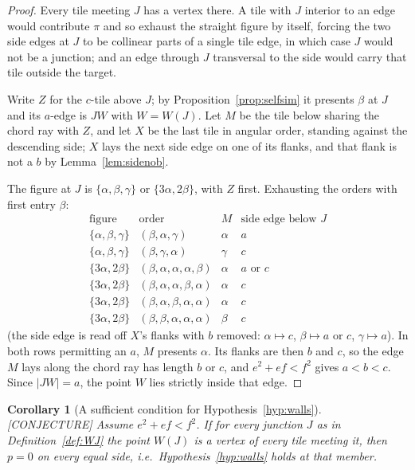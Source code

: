 \documentclass[11pt,reqno]{amsart}
\theoremstyle{plain}
\newtheorem{corollary}[theorem]{Corollary}
\theoremstyle{definition}
\newcommand{\lab}[1]{\hfill\textnormal{\footnotesize\textsc{[#1]}}}
\begin{document}
\begin{proof}
Every tile meeting $J$ has a vertex there. A tile with $J$ interior to an edge would contribute $\pi$
and so exhaust the straight figure by itself, forcing the two side edges at $J$ to be collinear parts of
a single tile edge, in which case $J$ would not be a junction; and an edge through $J$ transversal to the
side would carry that tile outside the target.

Write $Z$ for the $c$-tile above $J$; by Proposition~\ref{prop:selfsim} it presents $\beta$ at $J$ and
its $a$-edge is $JW$ with $W=W(J)$. Let $M$ be the tile below sharing the chord ray with $Z$, and let
$X$ be the last tile in angular order, standing against the descending side; $X$ lays the next side
edge on one of its flanks, and that flank is not a $b$ by Lemma~\ref{lem:sidenob}.

The figure at $J$ is $\{\alpha,\beta,\gamma\}$ or $\{3\alpha,2\beta\}$, with $Z$ first. Exhausting the
orders with first entry $\beta$:
\[
\begin{array}{llll}
\text{figure} & \text{order} & M & \text{side edge below }J\\\hline
\{\alpha,\beta,\gamma\} & (\beta,\alpha,\gamma) & \alpha & a\\
\{\alpha,\beta,\gamma\} & (\beta,\gamma,\alpha) & \gamma & c\\
\{3\alpha,2\beta\} & (\beta,\alpha,\alpha,\alpha,\beta) & \alpha & a \text{ or } c\\
\{3\alpha,2\beta\} & (\beta,\alpha,\alpha,\beta,\alpha) & \alpha & c\\
\{3\alpha,2\beta\} & (\beta,\alpha,\beta,\alpha,\alpha) & \alpha & c\\
\{3\alpha,2\beta\} & (\beta,\beta,\alpha,\alpha,\alpha) & \beta & c
\end{array}
\]
(the side edge is read off $X$'s flanks with $b$ removed: $\alpha\mapsto c$, $\beta\mapsto a$ or $c$,
$\gamma\mapsto a$). In both rows permitting an $a$, $M$ presents $\alpha$. Its flanks are then $b$ and
$c$, so the edge $M$ lays along the chord ray has length $b$ or $c$, and $e^{2}+ef<f^{2}$ gives
$a<b<c$. Since $|JW|=a$, the point $W$ lies strictly inside that edge.
\end{proof}

\begin{corollary}[A sufficient condition for Hypothesis~\ref{hyp:walls}]\label{cor:walls-from-T}\lab{CONJECTURE}
Assume $e^{2}+ef<f^{2}$. If for every junction $J$ as in Definition~\ref{def:WJ} the point $W(J)$ is a
\emph{vertex} of every tile meeting it, then $p=0$ on every equal side, i.e.\
Hypothesis~\ref{hyp:walls} holds at that member.
\end{corollary}
\end{document}
